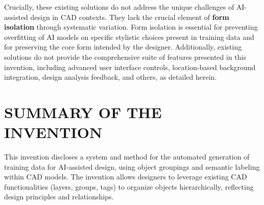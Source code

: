 \documentclass[12pt]{article}
\begin{document}
Crucially, these existing solutions do not address the unique challenges of AI-assisted design in CAD contexts. They lack the crucial element of \textbf{form isolation} through systematic variation. Form isolation is essential for preventing overfitting of AI models on specific stylistic choices present in training data and for preserving the core form intended by the designer. Additionally, existing solutions do not provide the comprehensive suite of features presented in this invention, including advanced user interface controls, location-based background integration, design analysis feedback, and others, as detailed herein.

\section{SUMMARY OF THE INVENTION}
This invention discloses a system and method for the automated generation of training data for AI-assisted design, using object groupings and semantic labeling within CAD models. The invention allows designers to leverage existing CAD functionalities (layers, groups, tags) to organize objects hierarchically, reflecting design principles and relationships. 





\end{document}
